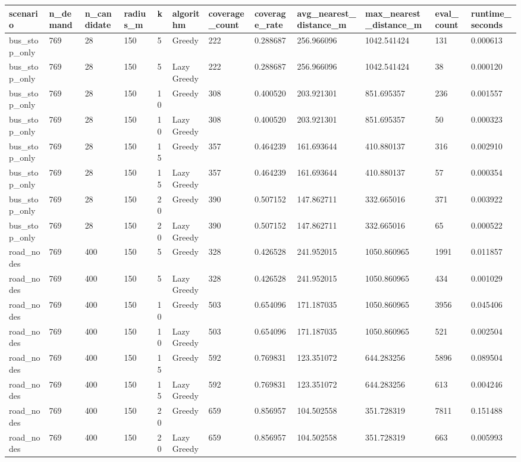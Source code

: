 \begin{tabular}{llllllllllll}
\hline
scenario & n_demand & n_candidate & radius_m & k & algorithm & coverage_count & coverage_rate & avg_nearest_distance_m & max_nearest_distance_m & eval_count & runtime_seconds \\
\hline
bus_stop_only & 769 & 28 & 150 & 5 & Greedy & 222 & 0.288687 & 256.966096 & 1042.541424 & 131 & 0.000613 \\
bus_stop_only & 769 & 28 & 150 & 5 & Lazy Greedy & 222 & 0.288687 & 256.966096 & 1042.541424 & 38 & 0.000120 \\
bus_stop_only & 769 & 28 & 150 & 10 & Greedy & 308 & 0.400520 & 203.921301 & 851.695357 & 236 & 0.001557 \\
bus_stop_only & 769 & 28 & 150 & 10 & Lazy Greedy & 308 & 0.400520 & 203.921301 & 851.695357 & 50 & 0.000323 \\
bus_stop_only & 769 & 28 & 150 & 15 & Greedy & 357 & 0.464239 & 161.693644 & 410.880137 & 316 & 0.002910 \\
bus_stop_only & 769 & 28 & 150 & 15 & Lazy Greedy & 357 & 0.464239 & 161.693644 & 410.880137 & 57 & 0.000354 \\
bus_stop_only & 769 & 28 & 150 & 20 & Greedy & 390 & 0.507152 & 147.862711 & 332.665016 & 371 & 0.003922 \\
bus_stop_only & 769 & 28 & 150 & 20 & Lazy Greedy & 390 & 0.507152 & 147.862711 & 332.665016 & 65 & 0.000522 \\
road_nodes & 769 & 400 & 150 & 5 & Greedy & 328 & 0.426528 & 241.952015 & 1050.860965 & 1991 & 0.011857 \\
road_nodes & 769 & 400 & 150 & 5 & Lazy Greedy & 328 & 0.426528 & 241.952015 & 1050.860965 & 434 & 0.001029 \\
road_nodes & 769 & 400 & 150 & 10 & Greedy & 503 & 0.654096 & 171.187035 & 1050.860965 & 3956 & 0.045406 \\
road_nodes & 769 & 400 & 150 & 10 & Lazy Greedy & 503 & 0.654096 & 171.187035 & 1050.860965 & 521 & 0.002504 \\
road_nodes & 769 & 400 & 150 & 15 & Greedy & 592 & 0.769831 & 123.351072 & 644.283256 & 5896 & 0.089504 \\
road_nodes & 769 & 400 & 150 & 15 & Lazy Greedy & 592 & 0.769831 & 123.351072 & 644.283256 & 613 & 0.004246 \\
road_nodes & 769 & 400 & 150 & 20 & Greedy & 659 & 0.856957 & 104.502558 & 351.728319 & 7811 & 0.151488 \\
road_nodes & 769 & 400 & 150 & 20 & Lazy Greedy & 659 & 0.856957 & 104.502558 & 351.728319 & 663 & 0.005993 \\
\hline
\end{tabular}
